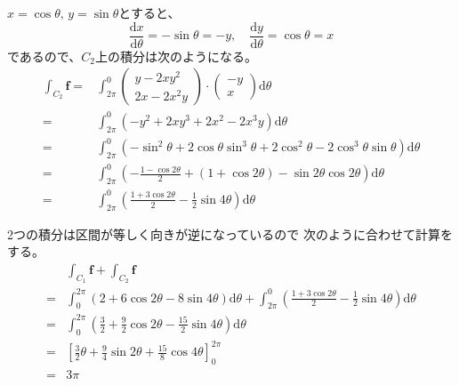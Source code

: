 \documentclass[12pt,b5paper]{ltjsarticle}
\begin{document}
\begin{enumerate}
\begin{enumerate}
            $x=\cos\theta,\,y=\sin\theta$とすると、
            \begin{equation}
             \frac{\mathrm{d} x}{\mathrm{d} \theta} = -\sin\theta = -y,\quad
              \frac{\mathrm{d} y}{\mathrm{d} \theta} = \cos\theta = x
            \end{equation}
            であるので、$C_2$上の積分は次のようになる。
            \begin{align}
             \int_{C_2}\bm{f}
             = & \int_{2\pi}^{0}
             \begin{pmatrix}y-2xy^2\\2x-2x^2y\end{pmatrix}
                  \cdot\begin{pmatrix}-y\\x\end{pmatrix}\mathrm{d}\theta\\
             = & \int_{2\pi}^{0}(-y^2+2xy^3+2x^2-2x^3y)\mathrm{d}\theta\\
             = & \int_{2\pi}^{0}(-\sin^2\theta+2\cos\theta\sin^3\theta+2\cos^2\theta-2\cos^3\theta\sin\theta)\mathrm{d}\theta\\
             =& \int_{2\pi}^{0}\left(-\frac{1-\cos2\theta}{2}+(1+\cos2\theta)-\sin2\theta\cos2\theta\right)\mathrm{d}\theta\\
             =& \int_{2\pi}^{0}\left(\frac{1+3\cos2\theta}{2}-\frac{1}{2}\sin4\theta\right)\mathrm{d}\theta
            \end{align}

            2つの積分は区間が等しく向きが逆になっているので
            次のように合わせて計算をする。
            \begin{align}
             & \int_{C_1}\bm{f} + \int_{C_2}\bm{f}\\
             =& \int_{0}^{2\pi}(2+6\cos2\theta-8\sin4\theta)\mathrm{d}\theta
             + \int_{2\pi}^{0}\left(\frac{1+3\cos2\theta}{2}-\frac{1}{2}\sin4\theta\right)\mathrm{d}\theta\\
             = & \int_{0}^{2\pi}\left(\frac{3}{2}+\frac{9}{2}\cos2\theta-\frac{15}{2}\sin4\theta\right)\mathrm{d}\theta\\
             = & \left[ \frac{3}{2}\theta+\frac{9}{4}\sin2\theta +\frac{15}{8}\cos4\theta \right]_{0}^{2\pi}\\
             = & 3\pi
            \end{align}
      \end{enumerate}


\end{enumerate}
\end{document}
